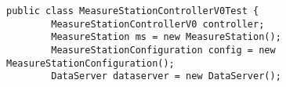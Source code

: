 \documentclass{article}
\begin{document}
\begin{verbatim}
public class MeasureStationControllerV0Test {   
        MeasureStationControllerV0 controller;  
        MeasureStation ms = new MeasureStation();   
        MeasureStationConfiguration config = new MeasureStationConfiguration();     
        DataServer dataserver = new DataServer();
\end{verbatim}
\end{document}
